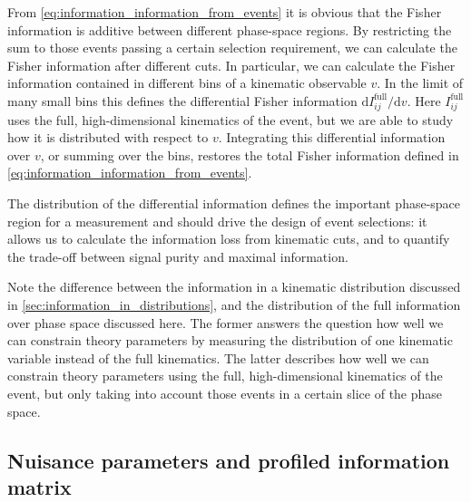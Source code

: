 From \autoref{eq:information_information_from_events} it is obvious
that the Fisher information is additive between different phase-space
regions.  By restricting the sum to those events passing a certain
selection requirement, we can calculate the Fisher information after
different cuts. In particular, we can calculate the Fisher information
contained in different bins of a kinematic observable $v$. In the
limit of many small bins this defines the differential Fisher
information $\mathrm{d} I_{ij}^{\text{full}} / \mathrm{d} v$.  Here
$I_{ij}^{\text{full}}$ uses the full, high-dimensional kinematics of
the event, but we are able to study how it is distributed with respect
to $v$. Integrating this differential information over $v$, or summing
over the bins, restores the total Fisher information defined in
\autoref{eq:information_information_from_events}.

The distribution of the differential information defines the important
phase-space region for a measurement and should drive the design of
event selections: it allows us to calculate the information loss from
kinematic cuts, and to quantify the trade-off between signal purity
and maximal information.

Note the difference between the information in a kinematic
distribution discussed in \autoref{sec:information_in_distributions},
and the distribution of the full information over phase space
discussed here. The former answers the question how well we can
constrain theory parameters by measuring the distribution of one
kinematic variable instead of the full kinematics. The latter
describes how well we can constrain theory parameters using the full,
high-dimensional kinematics of the event, but only taking into account
those events in a certain slice of the phase space.



\subsection{Nuisance parameters and profiled information matrix}
\label{sec:information_nuisance}

